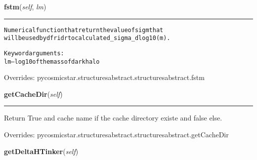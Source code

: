     \vspace{0.5ex}

\hspace{.8\funcindent}\begin{boxedminipage}{\funcwidth}

    \raggedright \textbf{fstm}(\textit{self}, \textit{lm})

    \vspace{-1.5ex}

    \rule{\textwidth}{0.5\fboxrule}
\setlength{\parskip}{2ex}
\begin{alltt}
Numerical function that return the value of sigm that
will be used by dfridr to calculate d\_sigma\_dlog10(m).

Keyword arguments:
    lm -- log10 of the mass of dark halo
\end{alltt}

\setlength{\parskip}{1ex}
      Overrides: pycosmicstar.structuresabstract.structuresabstract.fstm

    \end{boxedminipage}

    \vspace{0.5ex}

\hspace{.8\funcindent}\begin{boxedminipage}{\funcwidth}

    \raggedright \textbf{getCacheDir}(\textit{self})

    \vspace{-1.5ex}

    \rule{\textwidth}{0.5\fboxrule}
\setlength{\parskip}{2ex}
    Return True and cache name if the cache directory existe and false 
    else.

\setlength{\parskip}{1ex}
      Overrides: pycosmicstar.structuresabstract.structuresabstract.getCacheDir

    \end{boxedminipage}

    \label{pycosmicstar:structures:structures:getDeltaHTinker}

    \vspace{0.5ex}

\hspace{.8\funcindent}\begin{boxedminipage}{\funcwidth}

    \raggedright \textbf{getDeltaHTinker}(\textit{self})

\setlength{\parskip}{2ex}
\setlength{\parskip}{1ex}
    \end{boxedminipage}

